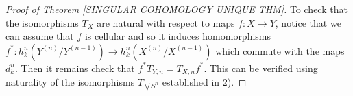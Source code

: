 \begin{proof}[Proof of Theorem \ref{SINGULAR COHOMOLOGY UNIQUE THM}]
To check that the isomorphisms $T_{X}$ are natural with respect to maps $f\colon X \to Y$, 
notice that we can assume that $f$ is cellular and so it induces homomorphisms 
$f^{\ast}\colon h^{n}_{k}(Y^{(n)}/Y^{(n-1)}) \to h^{n}_{k}(X^{(n)}/X^{(n-1)})$ 
which commute with the maps $d^{n}_{k}$. Then it remains check that 
$f^{\ast}T_{Y, n} = T_{X, n}f^{\ast}$. This can be verified using naturality of 
the isomorphisms $T_{\bigvee S^{n}}$ established in 2).






\end{proof}